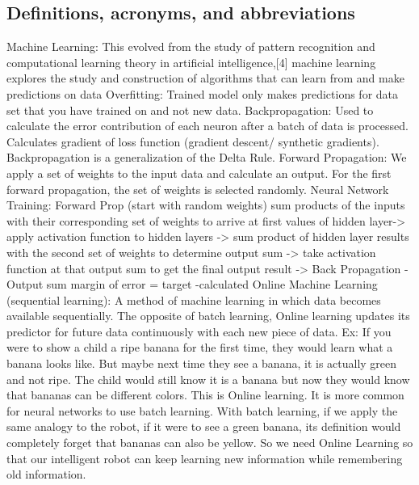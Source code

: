 \documentclass[draftclsnofoot, onecolumn, 10pt, compsoc]{IEEEtran}
\begin{document}
\subsection{Definitions, acronyms, and abbreviations}
Machine Learning: This evolved from the study of pattern recognition and computational learning theory in artificial intelligence,[4] machine learning explores the study and construction of algorithms that can learn from and make predictions on data
\newline \newline
Overfitting: Trained model only makes predictions for data set that you have trained on and not new data.
\newline \newline
Backpropagation: Used to calculate the error contribution of each neuron after a batch of data is processed. Calculates gradient of loss function (gradient descent/ synthetic gradients). Backpropagation is a generalization of the Delta Rule.
\newline \newline
Forward Propagation: We apply a set of weights to the input data and calculate an output. For the first forward propagation, the set of weights is selected randomly.
\newline \newline
Neural Network Training: Forward Prop (start with random weights) sum products of the inputs with their corresponding set of weights to arrive at first values of hidden layer-> apply activation function to hidden layers -> sum product of hidden layer results with the second set of weights to determine output sum -> take activation function at that output sum to get the final output result -> Back Propagation \cite{neuralnets} \newline
		-Output sum margin of error = target -calculated
\newline \newline
Online Machine Learning (sequential learning): A method of machine learning in which data becomes available sequentially. The opposite of batch learning, Online learning updates its predictor for future data continuously with each new piece of data. Ex: If you were to show a child a ripe banana for the first time, they would learn what a banana looks like. But maybe next time they see a banana, it is actually green and not ripe. The child would still know it is a banana but now they would know that bananas can be different colors. This is Online learning. It is more common for neural networks to use batch learning. With batch learning, if we apply the same analogy to the robot, if it were to see a green banana, its definition would completely forget that bananas can also be yellow. So we need Online Learning so that our intelligent robot can keep learning new information while remembering old information.
\end{document}
